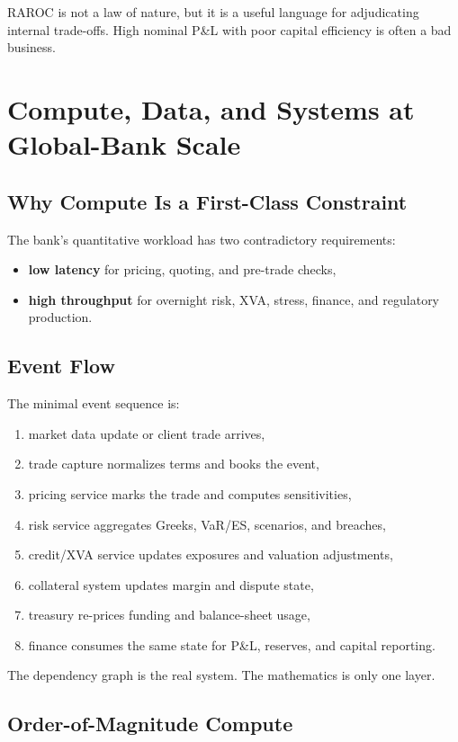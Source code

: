 \documentclass{apex_mdd}
\begin{document}
RAROC is not a law of nature, but it is a useful language for adjudicating internal trade-offs. High nominal P\&L with poor capital efficiency is often a bad business.

\section{Compute, Data, and Systems at Global-Bank Scale}

\subsection{Why Compute Is a First-Class Constraint}

The bank's quantitative workload has two contradictory requirements:
\begin{itemize}
  \item \textbf{low latency} for pricing, quoting, and pre-trade checks,
  \item \textbf{high throughput} for overnight risk, XVA, stress, finance, and regulatory production.
\end{itemize}

\subsection{Event Flow}

The minimal event sequence is:
\begin{enumerate}
  \item market data update or client trade arrives,
  \item trade capture normalizes terms and books the event,
  \item pricing service marks the trade and computes sensitivities,
  \item risk service aggregates Greeks, VaR/ES, scenarios, and breaches,
  \item credit/XVA service updates exposures and valuation adjustments,
  \item collateral system updates margin and dispute state,
  \item treasury re-prices funding and balance-sheet usage,
  \item finance consumes the same state for P\&L, reserves, and capital reporting.
\end{enumerate}

The dependency graph is the real system. The mathematics is only one layer.

\subsection{Order-of-Magnitude Compute}
\end{document}
